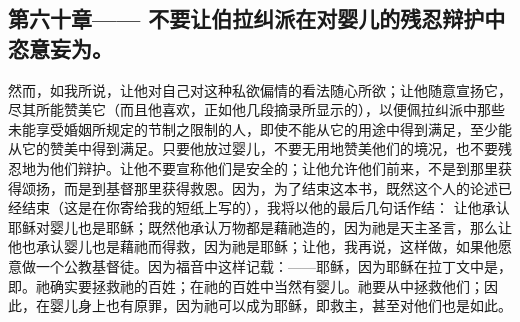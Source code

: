 
\subsection{第六十章—— 不要让伯拉纠派在对婴儿的残忍辩护中恣意妄为。}

然而，如我所说，让他对自己对这种私欲偏情的看法随心所欲；让他随意宣扬它，尽其所能赞美它（而且他喜欢，正如他几段摘录所显示的），以便佩拉纠派中那些未能享受婚姻所规定的节制之限制的人，即使不能从它的用途中得到满足，至少能从它的赞美中得到满足。只要他放过婴儿，不要无用地赞美他们的境况，也不要残忍地为他们辩护。让他不要宣称他们是安全的；让他允许他们前来，不是到那里获得颂扬，而是到基督那里获得救恩。因为，为了结束这本书，既然这个人的论述已经结束（这是在你寄给我的短纸上写的），我将以他的最后几句话作结： 让他承认耶稣对婴儿也是耶稣；既然他承认万物都是藉祂造的，因为祂是天主圣言，那么让他也承认婴儿也是藉祂而得救，因为祂是耶稣；让他，我再说，这样做，如果他愿意做一个公教基督徒。因为福音中这样记载：——耶稣，因为耶稣在拉丁文中是，即。祂确实要拯救祂的百姓；在祂的百姓中当然有婴儿。祂要从中拯救他们；因此，在婴儿身上也有原罪，因为祂可以成为耶稣，即救主，甚至对他们也是如此。\par

